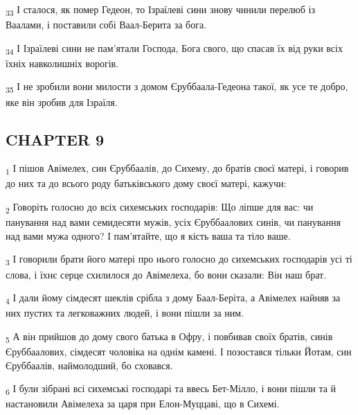 \begin{tcolorbox}
\textsubscript{33} І сталося, як помер Гедеон, то Ізраїлеві сини знову чинили перелюб із Ваалами, і поставили собі Ваал-Берита за бога.
\end{tcolorbox}
\begin{tcolorbox}
\textsubscript{34} І Ізраїлеві сини не пам'ятали Господа, Бога свого, що спасав їх від руки всіх їхніх навколишніх ворогів.
\end{tcolorbox}
\begin{tcolorbox}
\textsubscript{35} І не зробили вони милости з домом Єруббаала-Гедеона такої, як усе те добро, яке він зробив для Ізраїля.
\end{tcolorbox}
\subsection{CHAPTER 9}
\begin{tcolorbox}
\textsubscript{1} І пішов Авімелех, син Єруббаалів, до Сихему, до братів своєї матері, і говорив до них та до всього роду батьківського дому своєї матері, кажучи:
\end{tcolorbox}
\begin{tcolorbox}
\textsubscript{2} Говоріть голосно до всіх сихемських господарів: Що ліпше для вас: чи панування над вами семидесяти мужів, усіх Єруббаалових синів, чи панування над вами мужа одного? І пам'ятайте, що я кість ваша та тіло ваше.
\end{tcolorbox}
\begin{tcolorbox}
\textsubscript{3} І говорили брати його матері про нього голосно до сихемських господарів усі ті слова, і їхнє серце схилилося до Авімелеха, бо вони сказали: Він наш брат.
\end{tcolorbox}
\begin{tcolorbox}
\textsubscript{4} І дали йому сімдесят шеклів срібла з дому Баал-Беріта, а Авімелех найняв за них пустих та легковажних людей, і вони пішли за ним.
\end{tcolorbox}
\begin{tcolorbox}
\textsubscript{5} А він прийшов до дому свого батька в Офру, і повбивав своїх братів, синів Єруббаалових, сімдесят чоловіка на однім камені. І позостався тільки Йотам, син Єруббаалів, наймолодший, бо сховався.
\end{tcolorbox}
\begin{tcolorbox}
\textsubscript{6} І були зібрані всі сихемські господарі та ввесь Бет-Мілло, і вони пішли та й настановили Авімелеха за царя при Елон-Муццаві, що в Сихемі.
\end{tcolorbox}
